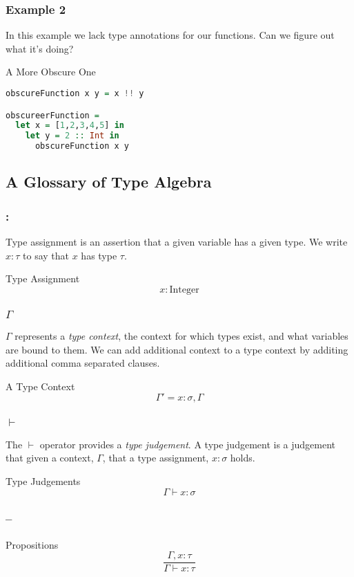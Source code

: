 \documentclass{beamer}
\begin{document}
\begin{frame}[fragile]
  \frametitle{Example 2}
  In this example we lack type annotations for our functions.  Can we
  figure out what it's doing?
  \begin{exampleblock}{A More Obscure One}
    \begin{lstlisting}[language=haskell]
obscureFunction x y = x !! y

obscureerFunction =
  let x = [1,2,3,4,5] in
    let y = 2 :: Int in
      obscureFunction x y
    \end{lstlisting}
  \end{exampleblock}
\end{frame}

\subsection{A Glossary of Type Algebra}

\begin{frame}
  \frametitle{:}
  Type assignment is an assertion that a given variable has a given
  type.  We write $x : \tau$ to say that $x$ has type $\tau$.
  \begin{exampleblock}{Type Assignment}
    \[
      x : \text{Integer}
    \]
  \end{exampleblock}
\end{frame}

\begin{frame}
  \frametitle{$\Gamma$}
  $\Gamma$ represents a \emph{type context}, the context for which
  types exist, and what variables are bound to them.  We can add
  additional context to a type context by additing additional comma
  separated clauses.
  \begin{exampleblock}{A Type Context}
    \[
      \Gamma' = x : \sigma, \Gamma
    \]
  \end{exampleblock}

\end{frame}

\begin{frame}
  \frametitle{$\vdash$}
  The $\vdash$ operator provides a \emph{type judgement}.  A type
  judgement is a judgement that given a context, $\Gamma$, that a type
  assignment, $x : \sigma$ holds.
  \begin{exampleblock}{Type Judgements}
    \[
      \Gamma \vdash x : \sigma
    \]
  \end{exampleblock}
\end{frame}

\begin{frame}
  \frametitle{\---}
  \begin{exampleblock}{Propositions}
    \[
      \frac{\Gamma, x : \tau}{\Gamma \vdash x : \tau}
    \]
  \end{exampleblock}
\end{frame}
\end{document}
